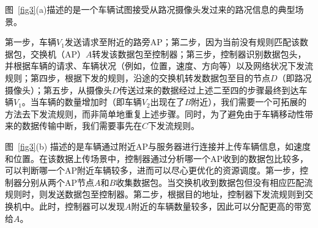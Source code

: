 \documentclass{ctexart}
\begin{document}
图~\ref{fig3}(a)描述的是一个车辆试图接受从路况摄像头发过来的路况信息的典型场景。


第一步，车辆$V_{1}$发送请求至附近的路旁AP；第二步，因为当前没有规则匹配该数据包，交换机（AP）$A$转发该数据包至控制器；第三步，控制器识别数据包头，并根据车辆的请求、车辆状况（例如，位置，速度、方向等）以及网络状况下发流规则；第四步，根据下发的规则，沿途的交换机转发数据包至目的节点$D$（即路况摄像头）；第五步，从摄像头$D$传送过来的数据经过上述二至四的步骤最终到达车辆$V_{1}$。当车辆的数量增加时（即车辆$V_{2}$出现在了$B$附近），我们需要一个可拓展的方法去下发流规则，而非简单地重复上述步骤。同时，为了避免由于车辆移动性带来的数据传输中断，我们需要事先在$C$下发流规则。


图~\ref{fig3}(b) 描述的是车辆通过附近AP与服务器进行连接并上传车辆信息，如速度和位置。在该数据上传场景中，控制器通过分析哪一个AP收到的数据包比较多，可以判断哪一个AP附近车辆较多，进而可以尽心更优化的资源调度。第一步，控制器分别从两个AP节点$A$和$B$收集数据包。当交换机收到数据包但没有相应匹配流规则时，则发送数据包至控制器。第二步，根据目的地址，控制器下发流规则到交换机中。此时，控制器可以发现$A$附近的车辆数量较多，因此可以分配更高的带宽给$A$。

\end{document}
